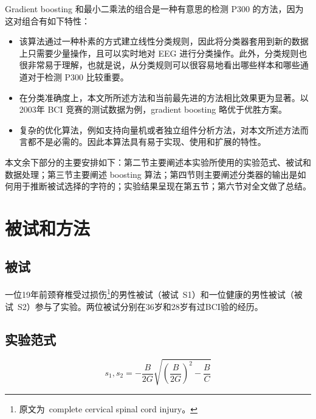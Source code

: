 \documentclass[a4paper]{ecust_translation}
\begin{document}
  Gradient boosting 和最小二乘法的组合是一种有意思的检测 P300 的方法，因为这对组合有如下特性：

  \begin{itemize}
    \item 该算法通过一种朴素的方式建立线性分类规则，因此将分类器套用到新的数据上只需要少量操作，且可以实时地对 EEG 进行分类操作。此外，分类规则也很非常易于理解，也就是说，从分类规则可以很容易地看出哪些样本和哪些通道对于检测 P300 比较重要。
    \item 在分类准确度上，本文所所述方法和当前最先进的方法相比效果更为显著。以2003年 BCI 竞赛的测试数据为例，gradient boosting 略优于优胜方案。
    \item 复杂的优化算法，例如支持向量机或者独立组件分析方法，对本文所述方法而言都不是必需的。因此本算法具有易于实现、使用和扩展的特性。
  \end{itemize}

  本文余下部分的主要安排如下：第二节主要阐述本实验所使用的实验范式、被试和数据处理；第三节主要阐述 boosting 算法；第四节则主要阐述分类器的输出是如何用于推断被试选择的字符的；实验结果呈现在第五节；第六节对全文做了总结。
  \section{被试和方法}
  \subsection{被试}
  一位19年前颈脊椎受过损伤\footnote{原文为~complete cervical spinal cord injury。}的男性被试（被试~S1）和一位健康的男性被试（被试~S2）参与了实验。两位被试分别在36岁和28岁有过BCI验的经历。
  \subsection{实验范式}

  \begin{equation}
  s_1, s_2= - \frac{B}{2G} \sqrt{(\frac{B}{2G})^2 - \frac{B}{C}}
  \end{equation}
\end{document}
